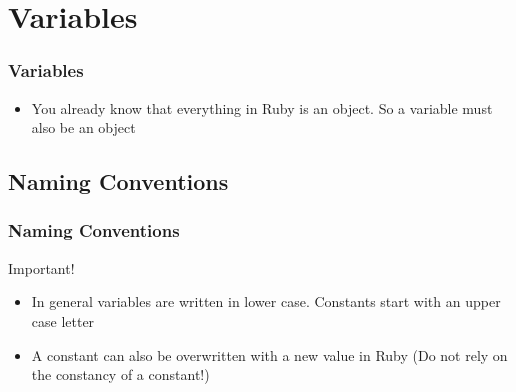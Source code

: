 \documentclass{beamer}
\begin{document}
\section{Variables}
\begin{frame}[fragile]
\frametitle{Variables}
\begin{itemize}
 \item You already know that everything in Ruby is an object. So a variable must also be an object
\end{itemize}

\end{frame}
\subsection{Naming Conventions}
\begin{frame}[fragile]
\frametitle{Naming Conventions}
\begin{block}{Important!}
\begin{itemize}
  \item In general variables are written in lower case. Constants start with an upper case letter
  \item A constant can also be overwritten with a new value in Ruby (Do not rely on the constancy of a constant!)
\end{itemize}

\end{block}

\end{frame}
\end{document}
